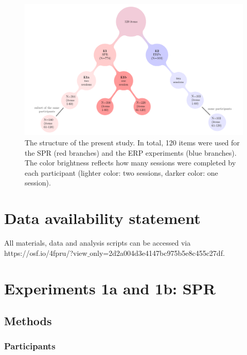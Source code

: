 \documentclass[review,preprint,12pt,authoryear,floatsintext]{elsarticle}
\begin{document}
\begin{figure}[ht]
    \caption{The structure of the present study. In total, 120 items were used for the SPR (red branches) and the ERP experiments (blue branches). The color brightness reflects how many sessions were completed by each participant (lighter color: two sessions, darker color: one session).}
    \label{fig:project_str}
    \centering
    \includegraphics[width=\textwidth]{pandora_project_structure_figure.pdf}
\end{figure}

\section{Data availability statement}
{All materials, data and analysis scripts can be accessed via \\ https://osf.io/4fpru/?view$\_$only=2d2a004d3e4147bc975b5e8c455c27df.}


\section{Experiments 1a and 1b: SPR}

\subsection{Methods}
\subsubsection{Participants}
\end{document}
